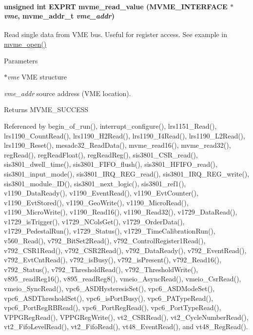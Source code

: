 \paragraph[{mvme\_\-read\_\-value}]{\setlength{\rightskip}{0pt plus 5cm}unsigned int EXPRT mvme\_\-read\_\-value ({\bf MVME\_\-INTERFACE} $\ast$ {\em vme}, \/  {\bf mvme\_\-addr\_\-t} {\em vme\_\-addr})}\hfill\label{group__mvmestdfunctionh_ga5cab05257f96039738eec34ec330e0d8}
Read single data from VME bus. Useful for register access. See example in \hyperlink{group__mvmestdfunctionh_ga13db7fc7c7c022e46fadd8fc4dc40047}{mvme\_\-open()} 
\begin{DoxyParams}{Parameters}
\item[{\em $\ast$vme}]VME structure \item[{\em vme\_\-addr}]source address (VME location). \end{DoxyParams}
\begin{DoxyReturn}{Returns}
MVME\_\-SUCCESS 
\end{DoxyReturn}


Referenced by begin\_\-of\_\-run(), interrupt\_\-configure(), lrs1151\_\-Read(), lrs1190\_\-CountRead(), lrs1190\_\-H2Read(), lrs1190\_\-I4Read(), lrs1190\_\-L2Read(), lrs1190\_\-Reset(), mesadc32\_\-ReadData(), mvme\_\-read16(), mvme\_\-read32(), regRead(), regReadFloat(), regReadReg(), sis3801\_\-CSR\_\-read(), sis3801\_\-dwell\_\-time(), sis3801\_\-FIFO\_\-flush(), sis3801\_\-HFIFO\_\-read(), sis3801\_\-input\_\-mode(), sis3801\_\-IRQ\_\-REG\_\-read(), sis3801\_\-IRQ\_\-REG\_\-write(), sis3801\_\-module\_\-ID(), sis3801\_\-next\_\-logic(), sis3801\_\-ref1(), v1190\_\-DataReady(), v1190\_\-EventRead(), v1190\_\-EvtCounter(), v1190\_\-EvtStored(), v1190\_\-GeoWrite(), v1190\_\-MicroRead(), v1190\_\-MicroWrite(), v1190\_\-Read16(), v1190\_\-Read32(), v1729\_\-DataRead(), v1729\_\-isTrigger(), v1729\_\-NColsGet(), v1729\_\-OrderData(), v1729\_\-PedestalRun(), v1729\_\-Status(), v1729\_\-TimeCalibrationRun(), v560\_\-Read(), v792\_\-BitSet2Read(), v792\_\-ControlRegister1Read(), v792\_\-CSR1Read(), v792\_\-CSR2Read(), v792\_\-DataReady(), v792\_\-EventRead(), v792\_\-EvtCntRead(), v792\_\-isBusy(), v792\_\-isPresent(), v792\_\-Read16(), v792\_\-Status(), v792\_\-ThresholdRead(), v792\_\-ThresholdWrite(), v895\_\-readReg16(), v895\_\-readReg8(), vmeio\_\-AsyncRead(), vmeio\_\-CsrRead(), vmeio\_\-SyncRead(), vpc6\_\-ASDHysteresisSet(), vpc6\_\-ASDModeSet(), vpc6\_\-ASDThresholdSet(), vpc6\_\-isPortBusy(), vpc6\_\-PATypeRead(), vpc6\_\-PortRegRBRead(), vpc6\_\-PortRegRead(), vpc6\_\-PortTypeRead(), VPPGRegRead(), VPPGRegWrite(), vt2\_\-CSRRead(), vt2\_\-CycleNumberRead(), vt2\_\-FifoLevelRead(), vt2\_\-FifoRead(), vt48\_\-EventRead(), and vt48\_\-RegRead().
